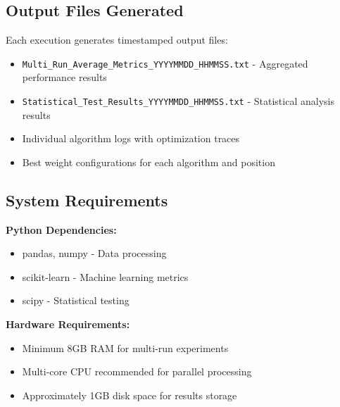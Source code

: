 \subsection{Output Files Generated}

Each execution generates timestamped output files:
\begin{itemize}
\item \texttt{Multi\_Run\_Average\_Metrics\_YYYYMMDD\_HHMMSS.txt} - Aggregated performance results
\item \texttt{Statistical\_Test\_Results\_YYYYMMDD\_HHMMSS.txt} - Statistical analysis results  
\item Individual algorithm logs with optimization traces
\item Best weight configurations for each algorithm and position
\end{itemize}

\subsection{System Requirements}

\textbf{Python Dependencies:}
\begin{itemize}
\item pandas, numpy - Data processing
\item scikit-learn - Machine learning metrics
\item scipy - Statistical testing
\end{itemize}

\textbf{Hardware Requirements:}
\begin{itemize}
\item Minimum 8GB RAM for multi-run experiments
\item Multi-core CPU recommended for parallel processing
\item Approximately 1GB disk space for results storage
\end{itemize}